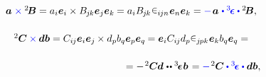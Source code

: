 \nopagebreak\vspace{-0.1em}\begin{equation*}
\begin{array}{c}
\bm{a} \hspace{.1ex} \mathcolor{blue}{\times} {^2\hspace{-0.16em}\bm{B}} = a_i \bm{e}_i \times \somebivalenttensorcomponents{\hspace{-0.1ex}j\hspace{-0.1ex}k} \bm{e}_j \bm{e}_k \hspace{-0.1ex} = \tikzmark{BeginVectorCrossTensor} a_i \somebivalenttensorcomponents{\hspace{-0.1ex}j\hspace{-0.1ex}k} \hspace{.1ex} \permutationsparitysymbols{i\hspace{-0.1ex}jn} \tikzmark{EndVectorCrossTensor} \bm{e}_n \bm{e}_k
= \mathcolor{blue}{-} \hspace{.2ex} \bm{a} \hspace{.15ex} \mathcolor{blue}{\dotp \permutationsparitytensor \dotp} \somebivalenttensor ,
\\[1.6em]
%
{^2\hspace{-0.05ex}\bm{C}} \mathcolor{blue}{\times} \hspace{-0.1ex} \bm{d} \bm{b} = C_{i\hspace{-0.1ex}j} \bm{e}_i \bm{e}_j \hspace{-0.1ex} \times d_p b_q \bm{e}_p \bm{e}_q \hspace{-0.1ex} = \bm{e}_i C_{i\hspace{-0.1ex}j} d_p \tikzmark{BeginTensorCrossTensor} \permutationsparitysymbols{j\hspace{-0.1ex}pk} \tikzmark{EndTensorCrossTensor} \bm{e}_k b_q \bm{e}_q =
\\[1.6em]
\hspace{12.5em} =
- \hspace{.2ex} {^2\hspace{-0.05ex}\bm{C}} \hspace{-0.1ex} \bm{d} \hspace{.12ex} \dotdotp \permutationsparitytensor \hspace{.1ex} \bm{b} \hspace{.2ex} =
\mathcolor{blue}{-} \hspace{.2ex} {^2\hspace{-0.05ex}\bm{C}} \mathcolor{blue}{\dotp \permutationsparitytensor \dotp} \bm{d} \bm{b} ,
\\
\end{array}
\end{equation*}%
